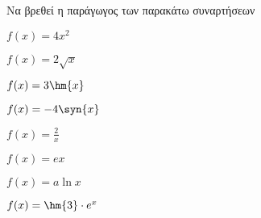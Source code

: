 Να βρεθεί η παράγωγος των παρακάτω συναρτήσεων
\begin{alist}
\item $ f(x)=4x^2 $
\item $ f(x)=2\sqrt{x} $
\item $ f(x)=3\hm{x} $
\item $ f(x)=-4\syn{x} $
\item $ f(x)=\frac{2}{x} $
\item $ f(x)=ex $
\item $ f(x)=a\ln{x} $
\item $ f(x)=\hm{3}\cdot e^x $
\end{alist}
